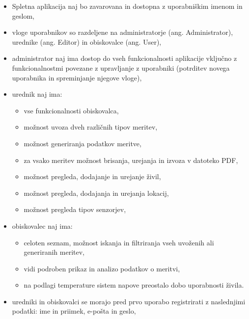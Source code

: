 \documentclass[a4paper, 12pt]{book}
\begin{document}
\begin{itemize}
\item Spletna aplikacija naj bo zavarovana in dostopna z uporabniškim imenom in geslom,

\item vloge uporabnikov so razdeljene na administratorje (ang. Administrator), urednike (ang. Editor) in obiskovalce (ang. User),  

\item administrator naj ima dostop do vseh funkcionalnosti aplikacije vključno z funkcionalnostmi povezane z upravljanje z uporabniki (potrditev novega uporabnika in spreminjanje njegove vloge),

\item urednik naj ima:
	\begin{itemize}
		\item vse funkcionalnosti obiskovalca,
		
		\item možnost uvoza dveh različnih tipov meritev,

		\item možnost generiranja podatkov meritve,

		\item za vsako meritev možnost brisanja, urejanja in izvoza v datoteko PDF,

		\item možnost pregleda, dodajanje in urejanje živil,

		\item možnost pregleda, dodajanja in urejanja lokacij,

		\item možnost pregleda tipov senzorjev,
	\end{itemize}

\item obiskovalec naj ima:
	\begin{itemize}
		\item celoten seznam, možnost iskanja in filtriranja vseh uvoženih ali generiranih meritev,
		
		\item vidi podroben prikaz in analizo podatkov o meritvi,
		
		\item na podlagi temperature sistem napove preostalo dobo uporabnosti živila.
	\end{itemize}
	
\item uredniki in obiskovalci se morajo pred prvo uporabo registrirati z naslednjimi podatki: ime in priimek, e-pošta in geslo,


\end{itemize}
\end{document}
